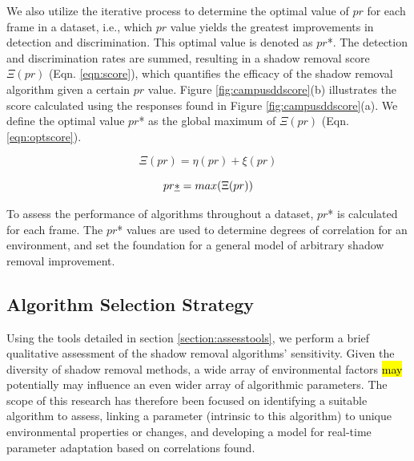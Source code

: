We also utilize the iterative process to determine the optimal value of $pr$ for each frame in a dataset, i.e., which $pr$ value yields the greatest improvements in detection and discrimination. This optimal value is denoted as $pr$*. The detection and discrimination rates are summed, resulting in a shadow removal score $\Xi(pr)$ (Eqn. \ref{eqn:score}), which quantifies the efficacy of the shadow removal algorithm given a certain $pr$ value. Figure \ref{fig:campusddscore}(b) illustrates the score calculated using the responses found in Figure \ref{fig:campusddscore}(a). We define the optimal value $pr$* as the global maximum of $\Xi(pr)$ (Eqn. \ref{eqn:optscore}).

\begin{equation}
\Xi(pr) = \eta(pr) + \xi(pr)
\label{eqn:score}
\end{equation}

\begin{equation}
pr\emph{*} = max(\Xi(pr))
\end{equation}

To assess the performance of algorithms throughout a dataset, $pr$* is calculated for each frame. The $pr$* values are used to determine degrees of correlation for an environment, and set the foundation for a general model of arbitrary shadow removal improvement.

\subsection{Algorithm Selection Strategy} \label{section:selectalgorithm}

Using the tools detailed in section \ref{section:assesstools}, we perform a brief qualitative assessment of the shadow removal algorithms' sensitivity. Given the diversity of shadow removal methods, a wide array of environmental factors \hl{may} potentially may influence an even wider array of algorithmic parameters. The scope of this research has therefore been focused on identifying a suitable algorithm to assess, linking a parameter (intrinsic to this algorithm) to unique environmental properties or changes, and developing a model for real-time parameter adaptation based on correlations found.


